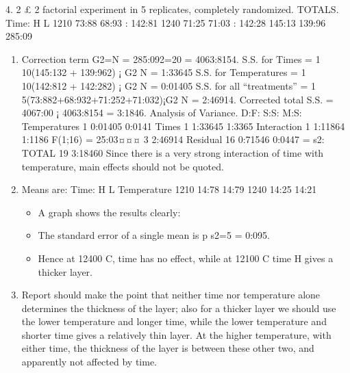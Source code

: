 \documentclass[a4paper,12pt]{article}
\begin{document}
4. 2 £ 2 factorial experiment in 5 replicates, completely randomized.
TOTALS.
Time: H L
1210 73:88 68:93 : 142:81
1240 71:25 71:03 : 142:28
145:13 139:96 285:09
\begin{enumerate}
\item  Correction term G2=N = 285:092=20 = 4063:8154.
S.S. for Times = 1
10(145:132 + 139:962) ¡ G2
N = 1:33645
S.S. for Temperatures = 1
10(142:812 + 142:282) ¡ G2
N = 0:01405
S.S. for all “treatments” = 1
5(73:882+68:932+71:252+71:032)¡G2
N = 2:46914.
Corrected total S.S. = 4067:00 ¡ 4063:8154 = 3:1846.
Analysis of Variance.
D:F: S:S: M:S:
Temperatures 1 0:01405 0:0141
Times 1 1:33645 1:3365
Interaction 1 1:11864 1:1186 F(1;16) = 25:03¤¤¤
3 2:46914
Residual 16 0:71546 0:0447 = s2:
TOTAL 19 3:18460
Since there is a very strong interaction of time with temperature, main effects
should not be quoted.
\item  Means are:
Time: H L
Temperature 1210 14:78 14:79
1240 14:25 14:21
\begin{itemize}
    \item A graph shows the results clearly:
\item The standard error of a single mean is
p
s2=5 = 0:095. \item Hence at 12400 C,
time has no effect, while at 12100 C time H gives a thicker layer.
\end{itemize}

\item  Report should make the point that neither time nor temperature alone
determines the thickness of the layer; also for a thicker layer we should
use the lower temperature and longer time, while the lower temperature
and shorter time gives a relatively thin layer. At the higher temperature,
with either time, the thickness of the layer is between these other two, and
apparently not affected by time.
\end{enumerate}
\end{document}
